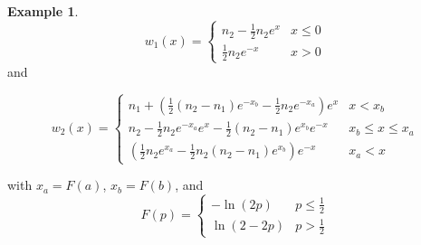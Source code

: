 \documentclass[11pt]{article}
\theoremstyle{definition}
\newtheorem{ex}[thm]{Example}
\numberwithin{equation}{section}
\numberwithin{thm}{section}
\renewcommand{\a}{a}
\renewcommand{\b}{b}
\newcommand{\m}{n_1}
\newcommand{\mtwo}{n_2}
\begin{document}
\begin{ex}
\begin{equation} \label{w1laplace}
w_1(x) =   \begin{cases} 
n_2 - \frac{1}{2} n_2 e^{x} & x \leq 0 \\
\frac{1}{2} n_2 e^{-x} & x > 0
\end{cases}
\end{equation}
and

\begin{equation} \label{w2laplace}
w_2(x) = \begin{cases}
\m + \left( \frac{1}{2}(\mtwo-\m)e^{-x_\b} - \frac{1}{2}\mtwo e^{-x_\a} \right) e^x & x < x_\b \\
\mtwo - \frac{1}{2} \mtwo e^{-x_\a} e^x - \frac{1}{2} (\mtwo-\m) e^{x_\b}   e^{-x} & x_\b \leq x \leq x_\a \\
\left( \frac{1}{2} \mtwo e^{x_\a} - \frac{1}{2}\mtwo(\mtwo-\m) e^{x_\b} \right) e^{-x} & x_\a < x 
\end{cases} \end{equation}

with $x_a = F(a)$, $x_b=F(b)$, and
\begin{equation}
F(p) = \begin{cases} -\ln(2p) &p \leq \frac{1}{2} \\ \ln(2-2p) & p > \frac{1}{2} \end{cases}
\end{equation}


\end{ex}
\end{document}
